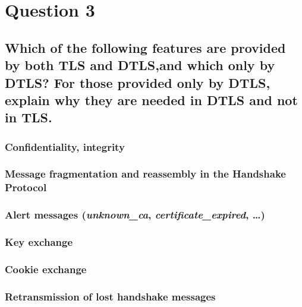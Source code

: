 \documentclass{report}
\begin{document}
	\section{Question 3}
	\startsection
		\renewcommand{\thesubsection}{\thesection.\Alph{subsection}}
		\subsection{Which of the following features are provided by both TLS and DTLS,and which only by DTLS? For those provided only by DTLS, explain why they are needed in DTLS and not in TLS.}
		\startsubsection
			\subsubsection{Confidentiality, integrity}
			\startsubsection
			\closesection
			\subsubsection{Message fragmentation and reassembly in the Handshake Protocol}
			\startsubsection
			\closesection
			\subsubsection{Alert messages (\textit{unknown\_ca}, \textit{certificate\_expired}, …)}
			\startsubsection
			\closesection
			\subsubsection{Key exchange}
			\startsubsection
			\closesection
			\subsubsection{Cookie exchange}
			\startsubsection
			\closesection
			\subsubsection{Retransmission of lost handshake messages}
			\startsubsection
			\closesection
		\closesection
	\closesection
\end{document}
